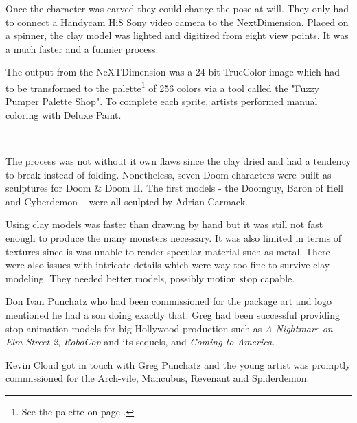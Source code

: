 \vspace{-4mm}
Once the character was carved they could change the pose at will. They only had to connect a Handycam Hi8 Sony video camera to the NextDimension. Placed on a spinner, the clay model was lighted and digitized from eight view points. It was a much faster and a funnier process.\\
\par
The output from the NeXTDimension was a 24-bit TrueColor image which had to be transformed to the \doom{}palette\footnote{See the \doom{}palette on page \pageref{doom_palette}.} of 256 colors via a tool called the "Fuzzy Pumper Palette Shop". To complete each sprite, artists performed manual coloring with Deluxe Paint.\\
\par
{}\\
\par
The process was not without it own flaws since the clay dried and had a tendency to break instead of folding. Nonetheless, seven Doom characters were built as sculptures for Doom \& Doom II. The first models - the Doomguy, Baron of Hell and Cyberdemon -- were all sculpted by Adrian Carmack.\\
\par
{}

\par
{}




\vspace{-4mm}
Using clay models was faster than drawing by hand but it was still not fast enough to produce the many monsters necessary. It was also limited in terms of textures since is was unable to render specular material such as metal. There were also issues with intricate details which were way too fine to survive clay modeling. They needed better models, possibly motion stop capable.\\
\par
Don Ivan Punchatz who had been commissioned for the \doom{}package art and logo mentioned he had a son doing exactly that. Greg had been successful providing stop animation models for big Hollywood production such as \textit{A Nightmare on Elm Street 2}, \textit{RoboCop} and its sequels, and \textit{Coming to America}. \\
\par
Kevin Cloud got in touch with Greg Punchatz and the young artist was promptly commissioned for the Arch-vile, Mancubus, Revenant and Spiderdemon.\\
\par

